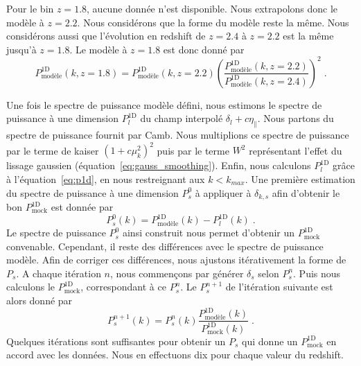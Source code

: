 Pour le bin $z = \num{1.8}$, aucune donnée \lya{} n'est disponible. Nous extrapolons donc le modèle à $z = \num{2.2}$. Nous considérons que la forme du modèle reste la même. Nous considérons aussi que l'évolution en redshift de $z = \num{2.4}$ à $z = \num{2.2}$ est la même jusqu'à $z = \num{1.8}$. Le modèle à $z = \num{1.8}$ est donc donné par
\begin{equation}
  P^{\mathrm{1D}}_{\mathrm{modèle}}(k, z=\num{1.8}) = P^{\mathrm{1D}}_{\mathrm{modèle}}(k, z=\num{2.2}) \left(\frac{P^{\mathrm{1D}}_{\mathrm{modèle}}(k, z=\num{2.2})}{P^{\mathrm{1D}}_{\mathrm{modèle}}(k, z=\num{2.4})} \right)^2 \; .
\end{equation}

Une fois le spectre de puissance modèle défini, nous estimons le spectre de puissance à une dimension $P^{\mathrm{1D}}_{l}$ du champ interpolé $\delta_l + c \eta_{\parallel}$. Nous partons du spectre de puissance fournit par Camb. Nous multiplions ce spectre de puissance par le terme de kaiser $(1 + c \mu_k^2)^2$ puis par le terme $W^2$ représentant l'effet du lissage gaussien (équation~\ref{eq:gauss_smoothing}). Enfin, nous calculons $P^{\mathrm{1D}}_{l}$ grâce à l'équation~\ref{eq:p1d}, en nous restreignant aux $k < k_{max}$. %
Une première estimation du spectre de puissance à une dimension $P_{s}^0$ à appliquer à $\delta_{k,s}$ afin d'obtenir le bon $P_{\mathrm{mock}}^{\mathrm{1D}}$ est donnée par
\begin{equation}
  P_{s}^0(k) = P^{\mathrm{1D}}_{\mathrm{modèle}}(k) - P^{\mathrm{1D}}_{l}(k) \; .
\end{equation}
Le spectre de puissance $P_{s}^0$ ainsi construit nous permet d'obtenir un $P_{\mathrm{mock}}^{\mathrm{1D}}$ convenable. Cependant, il reste des différences avec le spectre de puissance modèle. %
Afin de corriger ces différences, nous ajustons itérativement la forme de $P_{s}$. A chaque itération $n$, nous commençons par générer $\delta_s$ selon $P_{s}^n$. Puis nous calculons le $P_{\mathrm{mock}}^{\mathrm{1D}}$, correspondant à ce $P_{s}^n$. Le $P_{s}^{n+1}$ de l'itération suivante est alors donné par
\begin{equation}
  P_{s}^{n+1}(k) = P_{s}^{n}(k)
        \frac{
        P_{\mathrm{modèle}}^{\mathrm{1D}}(k)
      }{
        P_{\mathrm{mock}}^{\mathrm{1D}}(k)
      }
  \; .
\end{equation}
Quelques itérations sont suffisantes pour obtenir un $P_{s}$ qui donne un $P^{\mathrm{1D}}_{\mathrm{mock}}$ en accord avec les données. Nous en effectuons dix pour chaque valeur du redshift.

